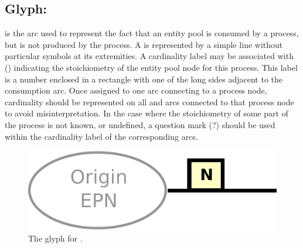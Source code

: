 

\subsection{Glyph: }
\label{sec:consumption}

 is the arc used to represent the fact that an entity pool is consumed by a process, but is not produced by the process. A  is represented by a simple line without particular symbols at its extremities. A cardinality label may be associated with  () indicating the stoichiometry of the entity pool node for this process. This label is a number enclosed in a rectangle with one of the long sides adjacent to the consumption arc. Once assigned to one arc connecting to a process node, cardinality should be represented on all  and  arcs connected to that process node to avoid misinterpretation. In the case where the stoichiometry of some part of the process is not known, or undefined, a question mark (?) should be used within the cardinality label
of the corresponding arcs.

\begin{figure}[H]
  \centering
  \includegraphics[scale = 0.4]{images/consumption}
  \caption{The \PD glyph for .}
  \label{fig:consumption}
\end{figure}


